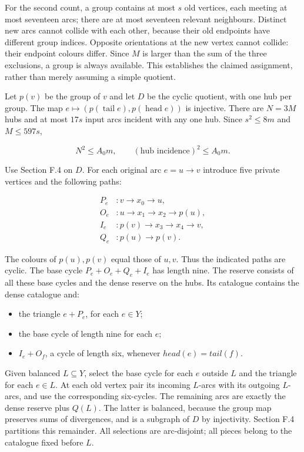 \documentclass[english,11pt,a4paper]{article}
\providecommand{\tightlist}{\setlength{\itemsep}{0pt}\setlength{\parskip}{0pt}}
\begin{document}
For the second count, a group contains at most \(s\) old vertices, each meeting at most seventeen arcs; there are at most seventeen relevant neighbours. Distinct new arcs cannot collide with each other, because their old endpoints have different group indices. Opposite orientations at the new vertex cannot collide: their endpoint colours differ. Since \(M\) is larger than the sum of the three exclusions, a group is always available. This establishes the claimed assignment, rather than merely assuming a simple quotient.

Let \(p(v)\) be the group of \(v\) and let \(D\) be the cyclic quotient, with one hub per group. The map \(e\mapsto(p(\operatorname{tail}e),p(\operatorname{head}e))\) is injective. There are \(N=3M\) hubs and at most \(17s\) input arcs incident with any one hub. Since \(s^{2}\le 8m\) and \(M\le 597s\),

\[N^2\le A_0m,\qquad(\text{hub incidence})^2\le A_0m.\tag{F.8}\]

Use Section F.4 on \(D\). For each original arc \(e=u\to v\) introduce five private vertices and the following paths:

\[\begin{aligned}P_e&:v\to x_0\to u,\\O_e&:u\to x_1\to x_2\to p(u),\\I_e&:p(v)\to x_3\to x_4\to v,\\Q_e&:p(u)\to p(v).\end{aligned}\]

The colours of \(p(u),p(v)\) equal those of \(u,v\). Thus the indicated paths are cyclic. The base cycle \(P_{e}+O_{e}+Q_{e}+I_{e}\) has length nine. The reserve consists of all these base cycles and the dense reserve on the hubs. Its catalogue contains the dense catalogue and:

\begin{itemize}
\tightlist
\item
  the triangle \(e+P_{e}\), for each \(e\in Y\);
\item
  the base cycle of length nine for each \(e\);
\item
  \(I_{e}+O_{f}\), a cycle of length six, whenever \(head(e)=tail(f)\).
\end{itemize}

Given balanced \(L\subseteq Y\), select the base cycle for each \(e\) outside \(L\) and the triangle for each \(e\in L\). At each old vertex pair its incoming \(L\)-arcs with its outgoing \(L\)-arcs, and use the corresponding six-cycles. The remaining arcs are exactly the dense reserve plus \(Q(L)\). The latter is balanced, because the group map preserves sums of divergences, and is a subgraph of \(D\) by injectivity. Section F.4 partitions this remainder. All selections are arc-disjoint; all pieces belong to the catalogue fixed before \(L\).
\end{document}

